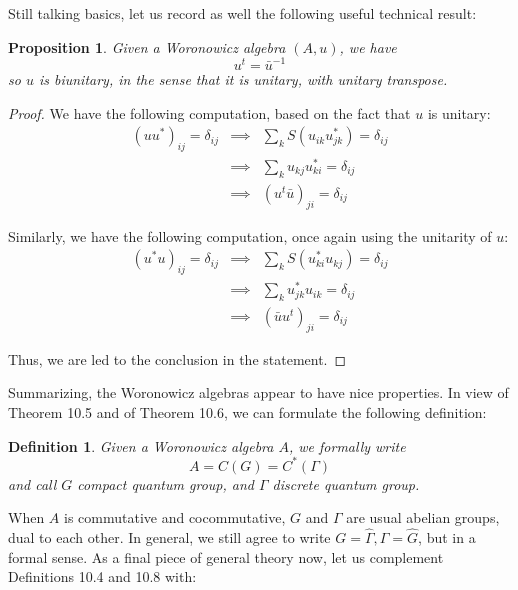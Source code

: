 \documentclass[12pt]{amsbook}
\newtheorem{definition}[theorem]{Definition}
\newtheorem{proposition}[theorem]{Proposition}
\begin{document}
Still talking basics, let us record as well the following useful technical result:


\begin{proposition}
Given a Woronowicz algebra $(A,u)$, we have 
$$u^t=\bar{u}^{-1}$$
so $u$ is biunitary, in the sense that it is unitary, with unitary transpose.
\end{proposition}

\begin{proof}
We have the following computation, based on the fact that $u$ is unitary:
\begin{eqnarray*}
(uu^*)_{ij}=\delta_{ij}
&\implies&\sum_kS(u_{ik}u_{jk}^*)=\delta_{ij}\\
&\implies&\sum_ku_{kj}u_{ki}^*=\delta_{ij}\\
&\implies&(u^t\bar{u})_{ji}=\delta_{ij}
\end{eqnarray*}

Similarly, we have the following computation, once again using the unitarity of $u$:
\begin{eqnarray*}
(u^*u)_{ij}=\delta_{ij}
&\implies&\sum_kS(u_{ki}^*u_{kj})=\delta_{ij}\\
&\implies&\sum_ku_{jk}^*u_{ik}=\delta_{ij}\\
&\implies&(\bar{u}u^t)_{ji}=\delta_{ij}
\end{eqnarray*}

Thus, we are led to the conclusion in the statement.
\end{proof}

Summarizing, the Woronowicz algebras appear to have nice properties. In view of Theorem 10.5 and of Theorem 10.6, we can formulate the following definition:


\begin{definition}
Given a Woronowicz algebra $A$, we formally write
$$A=C(G)=C^*(\Gamma)$$
and call $G$ compact quantum group, and $\Gamma$ discrete quantum group.
\end{definition}

When $A$ is commutative and cocommutative, $G$ and $\Gamma$ are usual abelian groups, dual to each other. In general, we still agree to write $G=\widehat{\Gamma},\Gamma=\widehat{G}$, but in a formal sense. As a final piece of general theory now, let us complement Definitions 10.4 and 10.8 with:
\end{document}
